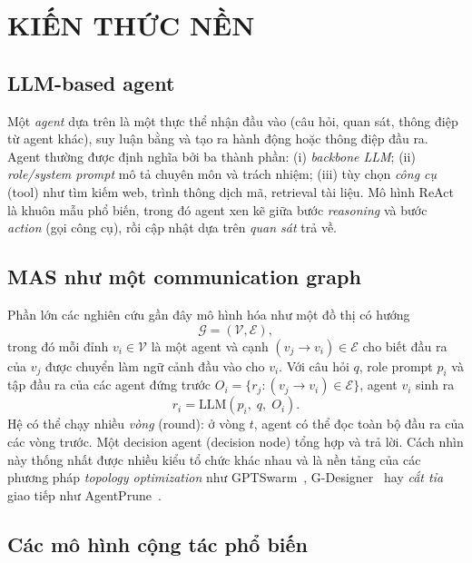 \chapter{KIẾN THỨC NỀN}
\label{chap:background}

\section{LLM-based agent}

Một \emph{agent} dựa trên \LLM{} là một thực thể nhận đầu vào (câu hỏi, quan sát, thông điệp từ agent khác), suy luận bằng \LLM{} và tạo ra hành động hoặc thông điệp đầu ra. Agent thường được định nghĩa bởi ba thành phần: (i) \emph{backbone LLM}; (ii) \emph{role/system prompt} mô tả chuyên môn và trách nhiệm; (iii) tùy chọn \emph{công cụ} (tool) như tìm kiếm web, trình thông dịch mã, retrieval tài liệu. Mô hình ReAct~\cite{react} là khuôn mẫu phổ biến, trong đó agent xen kẽ giữa bước \emph{reasoning} và bước \emph{action} (gọi công cụ), rồi cập nhật dựa trên \emph{quan sát} trả về.

\section{MAS như một communication graph}

Phần lớn các nghiên cứu gần đây mô hình hóa \MAS{} như một đồ thị có hướng
\begin{equation}
  \mathcal{G} = (\mathcal{V}, \mathcal{E}),
\end{equation}
trong đó mỗi đỉnh $v_i \in \mathcal{V}$ là một agent và cạnh $(v_j \to v_i) \in \mathcal{E}$ cho biết đầu ra của $v_j$ được chuyển làm ngữ cảnh đầu vào cho $v_i$. Với câu hỏi $q$, role prompt $p_i$ và tập đầu ra của các agent đứng trước $O_i = \{r_j : (v_j \to v_i)\in\mathcal{E}\}$, agent $v_i$ sinh ra
\begin{equation}
  r_i = \mathrm{LLM}(p_i,\; q,\; O_i).
  \label{eq:agent}
\end{equation}
Hệ có thể chạy nhiều \emph{vòng} (round): ở vòng $t$, agent có thể đọc toàn bộ đầu ra của các vòng trước. Một decision agent (decision node) tổng hợp và trả lời. Cách nhìn này thống nhất được nhiều kiểu tổ chức khác nhau và là nền tảng của các phương pháp \emph{topology optimization} như GPTSwarm~\cite{gptswarm}, G-Designer~\cite{gdesigner} hay \emph{cắt tỉa} giao tiếp như AgentPrune~\cite{agentprune}.

\section{Các mô hình cộng tác phổ biến}

